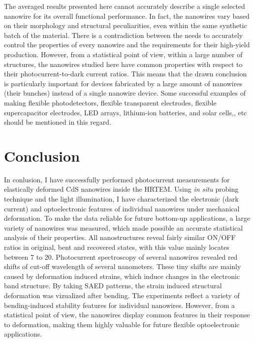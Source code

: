 The averaged results presented here cannot accurately describe a single selected nanowire for its overall functional performance. 
In fact, the nanowires vary based on their morphology and structural peculiarities, even within the same synthetic batch of the material. 
There is a contradiction between the needs to accurately control the properties of every nanowire and the requirements for their high-yield production. However, from a statistical point of view, within a large number of structures, the nanowires studied here have common properties with respect to their photocurrent-to-dark current ratios. 
This means that the drawn conclusion is particularly important for devices fabricated by a large amount of nanowires (their bunches) instead of a single nanowire device. 
Some successful examples of making flexible photodetectors,\cite{Xu2015b} flexible transparent electrodes,\cite{Liu2014a} flexible supercapacitor electrodes,\cite{Liu2014a} LED arrays,\cite{Wang2015a} lithium-ion batteries,\cite{Wang2015} and solar cells,\cite{Zhang2012}, etc should be mentioned in this regard. \\



\section{Conclusion}
In conlusion, I have successfully performed photocurrent measurements for elastically deformed CdS nanowires inside the HRTEM. Using {\em in situ}  probing technique and the light illumination, I have characterized the electronic (dark current) and optoelectronic features of individual nanowires under mechanical deformation. 
To make the data reliable for future bottom-up applications, a large variety of nanowires was measured, which made possible an accurate statistical analysis of their properties. 
All nanostructures reveal fairly similar ON/OFF ratios in original, bent and recovered states, with this value mainly locates between 7 to 20. 
Photocurrent spectroscopy of several nanowires revealed red shifts of cut-off wavelength of several nanometers. 
These tiny shifts are mainly caused by deformation induced strains, which induce changes in the electronic band structure. 
By taking SAED patterns, the strain induced structural deformation was vizualized after bending. 
The experiments reflect a variety of bending-induced stability features for individual nanowires. However, from a statistical point of view, the nanowires display common features in their response to deformation, making them highly valuable for future flexible optoelectronic applications. 

